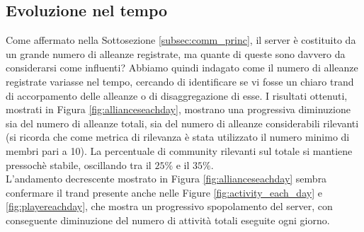 \newpage
\subsection{Evoluzione nel tempo}
\label{subsec:eot}
Come affermato nella Sottosezione \ref{subsec:comm_princ}, il server è costituito da un grande numero di alleanze registrate, ma quante di queste sono davvero da considerarsi come influenti? Abbiamo quindi indagato come il numero di alleanze registrate variasse nel tempo, cercando di identificare se vi fosse un chiaro trand di accorpamento delle alleanze o di disaggregazione di esse. I risultati ottenuti, mostrati in Figura \ref{fig:allianceseachday}, mostrano una progressiva diminuzione sia del numero di alleanze totali, sia del numero di alleanze considerabili rilevanti (si ricorda che come metrica di rilevanza è stata utilizzato il numero minimo di membri pari a 10). La percentuale di community rilevanti sul totale si mantiene pressochè stabile, oscillando tra il $25\%$ e il $35\%$.\\
L'andamento decrescente mostrato in Figura \ref{fig:allianceseachday} sembra confermare il trand presente anche nelle Figure \ref{fig:activity_each_day} e \ref{fig:playereachday}, che mostra un progressivo spopolamento del server, con conseguente diminuzione del numero di attività totali eseguite ogni giorno.

